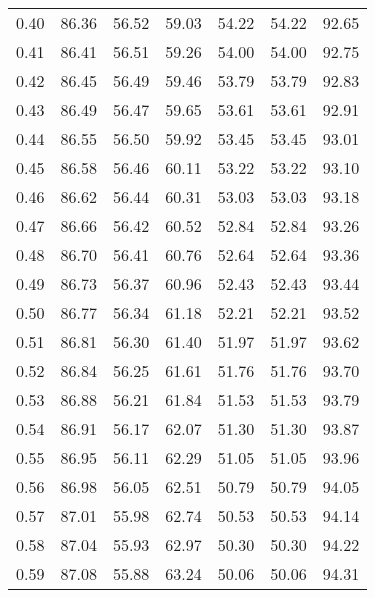 \begin{tabular}{|c|c|c|c|c|c|c|}
      0.40 &     86.36 &     56.52 &      59.03 &   54.22 &      54.22 &         92.65 \\
      0.41 &     86.41 &     56.51 &      59.26 &   54.00 &      54.00 &         92.75 \\
      0.42 &     86.45 &     56.49 &      59.46 &   53.79 &      53.79 &         92.83 \\
      0.43 &     86.49 &     56.47 &      59.65 &   53.61 &      53.61 &         92.91 \\
      0.44 &     86.55 &     56.50 &      59.92 &   53.45 &      53.45 &         93.01 \\
      0.45 &     86.58 &     56.46 &      60.11 &   53.22 &      53.22 &         93.10 \\
      0.46 &     86.62 &     56.44 &      60.31 &   53.03 &      53.03 &         93.18 \\
      0.47 &     86.66 &     56.42 &      60.52 &   52.84 &      52.84 &         93.26 \\
      0.48 &     86.70 &     56.41 &      60.76 &   52.64 &      52.64 &         93.36 \\
      0.49 &     86.73 &     56.37 &      60.96 &   52.43 &      52.43 &         93.44 \\
      0.50 &     86.77 &     56.34 &      61.18 &   52.21 &      52.21 &         93.52 \\
      0.51 &     86.81 &     56.30 &      61.40 &   51.97 &      51.97 &         93.62 \\
      0.52 &     86.84 &     56.25 &      61.61 &   51.76 &      51.76 &         93.70 \\
      0.53 &     86.88 &     56.21 &      61.84 &   51.53 &      51.53 &         93.79 \\
      0.54 &     86.91 &     56.17 &      62.07 &   51.30 &      51.30 &         93.87 \\
      0.55 &     86.95 &     56.11 &      62.29 &   51.05 &      51.05 &         93.96 \\
      0.56 &     86.98 &     56.05 &      62.51 &   50.79 &      50.79 &         94.05 \\
      0.57 &     87.01 &     55.98 &      62.74 &   50.53 &      50.53 &         94.14 \\
      0.58 &     87.04 &     55.93 &      62.97 &   50.30 &      50.30 &         94.22 \\
      0.59 &     87.08 &     55.88 &      63.24 &   50.06 &      50.06 &         94.31 \\

\end{tabular}
